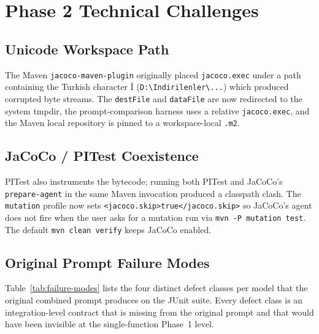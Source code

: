 \documentclass[journal]{IEEEtran}
\begin{document}
\section{Phase 2 Technical Challenges}\label{sec:phase2-challenges}

\subsection{Unicode Workspace Path}
The Maven \texttt{jacoco-maven-plugin} originally placed
\texttt{jacoco.exec} under a path containing the Turkish character
\.{I} (\verb|D:\Indirilenler\...|) which produced corrupted byte streams.
The \texttt{destFile} and \texttt{dataFile} are now redirected to the
system tmpdir, the prompt-comparison harness uses a relative
\texttt{jacoco.exec}, and the Maven local repository is pinned to a
workspace-local \texttt{.m2}.

\subsection{JaCoCo / PITest Coexistence}
PITest also instruments the bytecode; running both PITest and JaCoCo's
\texttt{prepare-agent} in the same Maven invocation produced a classpath
clash. The \texttt{mutation} profile now sets \texttt{<jacoco.skip>true</jacoco.skip>}
so JaCoCo's agent does not fire when the user asks for a mutation run via
\texttt{mvn -P mutation test}. The default \texttt{mvn clean verify} keeps
JaCoCo enabled.

\subsection{Original Prompt Failure Modes}

Table~\ref{tab:failure-modes} lists the four distinct defect classes per
model that the original combined prompt produces on the JUnit suite.
Every defect class is an integration-level contract that is missing from
the original prompt and that would have been invisible at the
single-function Phase~1 level.
\end{document}
